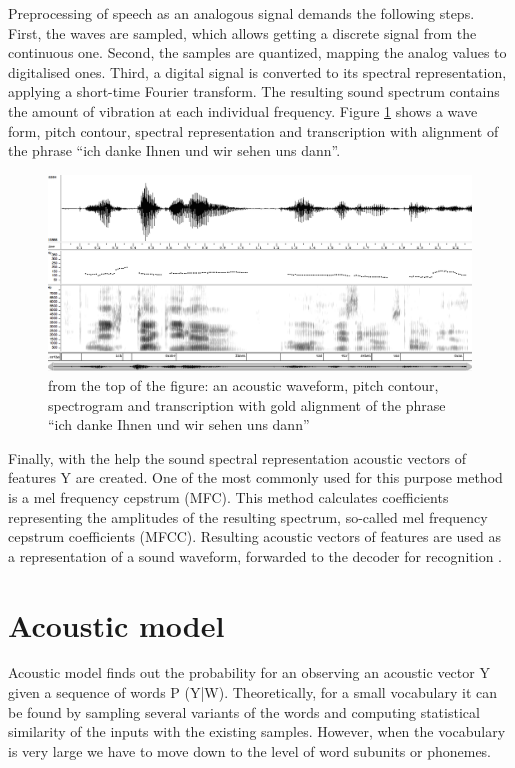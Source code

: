 Preprocessing of speech as an analogous signal demands the following steps. First, the waves are sampled, which allows getting a discrete signal from the 
continuous one. Second, the samples are quantized, mapping the analog values to digitalised ones. Third, a digital signal is converted to its 
spectral representation, applying a short-time Fourier transform. The resulting sound spectrum contains the amount of vibration at each individual frequency. 
Figure \ref {fig:spectro} shows a wave form, pitch contour, spectral
representation and transcription with alignment of the phrase ``ich danke
 Ihnen und wir sehen uns dann''.
\begin{figure}[htbp]
  \centering
    \includegraphics[width=1.0\textwidth]{images/spectro.png}
 \caption{from the top of the figure: an acoustic waveform, pitch contour,
 spectrogram and transcription with gold alignment of the phrase ``ich danke
 Ihnen und wir sehen uns dann'' }
  \label{fig:spectro}
\end {figure}

Finally, with the help the sound spectral representation acoustic vectors of
features Y are created. One of the most commonly used for this purpose method is a mel frequency
cepstrum (MFC). This method calculates coefficients representing the amplitudes
of the resulting spectrum, so-called mel frequency cepstrum coefficients (MFCC).
Resulting acoustic vectors of features are used as a representation of a sound waveform, forwarded to the decoder for recognition  \parencite
{jurafskymartin2009}.

\section {Acoustic model} 

Acoustic model finds out the probability for an observing an acoustic vector Y
given a sequence of words P (Y|W). Theoretically, for a small vocabulary it can
be found by sampling several variants of the words and computing statistical similarity of the inputs with 
the existing samples. However, when the vocabulary is very large we have to move
down to the level of word subunits or phonemes.

